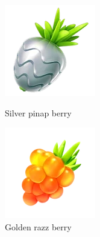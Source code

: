 \begin{figure}[h!]
  \begin{minipage}[t]{0.5\textwidth}
    \begin{center}
    \includegraphics[width=\textwidth]{images/silverpinap.png}
    \end{center}
    \caption*{Silver pinap berry}
    \label{fig:silverpinap}
  \end{minipage}
  \begin{minipage}[t]{0.5\textwidth}
    \begin{center}
    \includegraphics[width=\textwidth]{images/goldenrazz.png}
    \end{center}
    \caption*{Golden razz berry}
    \label{fig:goldenrazz}
  \end{minipage}
\end{figure}

